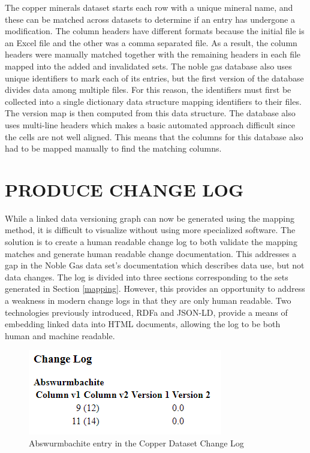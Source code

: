 The copper minerals dataset starts each row with a unique mineral name, and these can be matched across datasets to determine if an entry has undergone a modification.
The column headers have different formats because the initial file is an Excel file and the other was a comma separated file.
As a result, the column headers were manually matched together with the remaining headers in each file mapped into the added and invalidated sets.
The noble gas database also uses unique identifiers to mark each of its entries, but the first version of the database divides data among multiple files.
For this reason, the identifiers must first be collected into a single dictionary data structure mapping identifiers to their files.
The version map is then computed from this data structure.
The database also uses multi-line headers which makes a basic automated approach difficult since the cells are not well aligned.
This means that the columns for this database also had to be mapped manually to find the matching columns.

\section{PRODUCE CHANGE LOG}

While a linked data versioning graph can now be generated using the mapping method, it is difficult to visualize without using more specialized software.
The solution is to create a human readable change log to both validate the mapping matches and generate human readable change documentation.
This addresses a gap in the Noble Gas data set's documentation which describes data use, but not data changes.
The log is divided into three sections corresponding to the sets generated in Section \ref{mapping}.
However, this provides an opportunity to address a weakness in modern change logs in that they are only human readable.
Two technologies previously introduced, RDFa and JSON-LD, provide a means of embedding linked data into HTML documents, allowing the log to be both human and machine readable.

\begin{figure}
	\centering
	\includegraphics[scale=0.80]{figures/Changelog-zoomed.png}
	\caption{Abswurmbachite entry in the Copper Dataset Change Log}
	\label{changelog_zoomed}
\end{figure}


